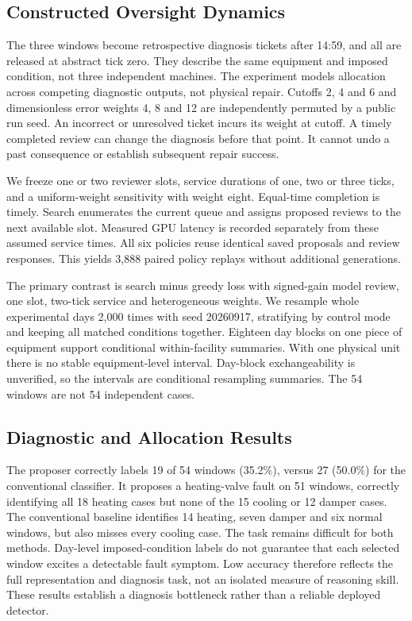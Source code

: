 \subsection{Constructed Oversight Dynamics}
The three windows become retrospective diagnosis tickets after 14:59, and all are released at abstract tick zero. They describe the same equipment and imposed condition, not three independent machines. The experiment models allocation across competing diagnostic outputs, not physical repair. Cutoffs 2, 4 and 6 and dimensionless error weights 4, 8 and 12 are independently permuted by a public run seed. An incorrect or unresolved ticket incurs its weight at cutoff. A timely completed review can change the diagnosis before that point. It cannot undo a past consequence or establish subsequent repair success.

We freeze one or two reviewer slots, service durations of one, two or three ticks, and a uniform-weight sensitivity with weight eight. Equal-time completion is timely. Search enumerates the current queue and assigns proposed reviews to the next available slot. Measured GPU latency is recorded separately from these assumed service times. All six policies reuse identical saved proposals and review responses. This yields 3,888 paired policy replays without additional generations.

The primary contrast is search minus greedy loss with signed-gain model review, one slot, two-tick service and heterogeneous weights. We resample whole experimental days 2,000 times with seed 20260917, stratifying by control mode and keeping all matched conditions together. Eighteen day blocks on one piece of equipment support conditional within-facility summaries. With one physical unit there is no stable equipment-level interval. Day-block exchangeability is unverified, so the intervals are conditional resampling summaries. The 54 windows are not 54 independent cases.

\subsection{Diagnostic and Allocation Results}
The proposer correctly labels 19 of 54 windows (35.2\%), versus 27 (50.0\%) for the conventional classifier. It proposes a heating-valve fault on 51 windows, correctly identifying all 18 heating cases but none of the 15 cooling or 12 damper cases. The conventional baseline identifies 14 heating, seven damper and six normal windows, but also misses every cooling case. The task remains difficult for both methods. Day-level imposed-condition labels do not guarantee that each selected window excites a detectable fault symptom. Low accuracy therefore reflects the full representation and diagnosis task, not an isolated measure of reasoning skill. These results establish a diagnosis bottleneck rather than a reliable deployed detector.

